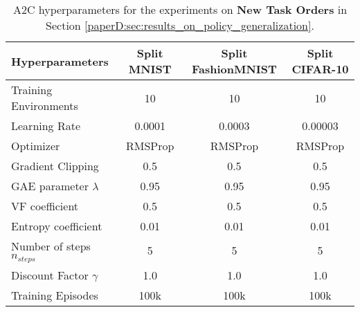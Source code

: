 \begin{table}[h]
\small
\centering
\caption{DQN hyperparameters for the experiments on {\bf New Task Orders} in Section \ref{paperD:sec:results_on_policy_generalization}.  
}
\vspace{-2mm}
\label{tab:dqn_hyperparameters_new_task_orders}
\end{table}

\begin{table}[h]
\small
\centering
\caption{A2C hyperparameters for the experiments on {\bf New Task Orders} in Section \ref{paperD:sec:results_on_policy_generalization}.  
}
\vspace{-2mm}
\label{tab:a2c_hyperparameters_new_task_orders}
\begin{tabular}{l c c c}
\toprule
 {\bf Hyperparameters} & {\bf Split MNIST} & {\bf Split FashionMNIST} & {\bf Split CIFAR-10} \\
 \midrule
 Training Environments & 10 & 10 & 10 \\
 Learning Rate  & 0.0001 & 0.0003 & 0.00003 \\
 Optimizer      & RMSProp & RMSProp & RMSProp \\
 Gradient Clipping & 0.5 & 0.5 & 0.5 \\
 GAE parameter $\lambda$ & 0.95 & 0.95 & 0.95 \\
 VF coefficient & 0.5 & 0.5 & 0.5 \\
 Entropy coefficient & 0.01 & 0.01 & 0.01 \\
 Number of steps $n_{steps}$ & 5 & 5 & 5 \\
 Discount Factor $\gamma$ & 1.0 & 1.0 & 1.0 \\
 Training Episodes & 100k & 100k & 100k \\
\bottomrule
\end{tabular}
\end{table}

